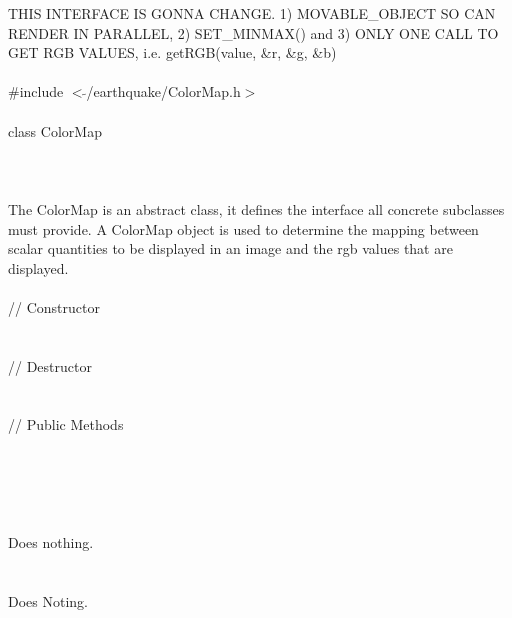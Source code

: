
THIS INTERFACE IS GONNA CHANGE. 1) MOVABLE\_OBJECT SO CAN RENDER IN
PARALLEL, 2) SET\_MINMAX() and 3) ONLY ONE CALL TO GET RGB VALUES, i.e.
getRGB(value, \&r, \&g, \&b) \\

   \\
\indent \#include $<\tilde{ }$/earthquake/ColorMap.h$>$  \\

  \\
\indent class ColorMap   \\

 \\
 \\

 \\ 
\indent 
The ColorMap is an abstract class, it defines the interface all
concrete subclasses must provide. A ColorMap object is used to
determine the mapping between scalar quantities to be displayed in an
image and the rgb values that are displayed. \\

 \\
\indent // Constructor \\ 
\\ \\
\indent // Destructor \\ 
\\  \\
\indent // Public Methods\\ 
\\
\\
\\

 \\ 
\\ 
Does nothing. \\

 \\
\\  
Does Noting. \\

